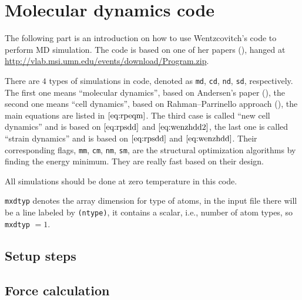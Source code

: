 
\section{Molecular dynamics code}
\label{sec:mdc}

The following part is an introduction on how to use
Wentzcovitch's code to perform MD simulation. The code is
based on one of her papers (\cite{Wentzcovitch:1991ka}), hanged at
\url{http://vlab.msi.umn.edu/events/download/Program.zip}.

There are $4$ types of simulations in code,
denoted as \texttt{md}, \texttt{cd}, \texttt{nd}, \texttt{sd},
respectively. The first one means ``molecular dynamics'',
based on Andersen's paper (\cite{Andersen:1980ew}),
the second one means ``cell dynamics'', based on
Rahman–Parrinello approach (\cite{Parrinello:1980kx}),
the main equations are listed in $\eqref{eq:rpeqm}$.
The third case is called ``new cell dynamics'' and is based on
$\eqref{eq:rpsdd}$ and $\eqref{eq:wenzhdd2}$,
the last one is called ``strain dynamics'' and is based on
$\eqref{eq:rpsdd}$ and $\eqref{eq:wenzhdd}$.
Their corresponding flags, \texttt{mm}, \texttt{cm},
\texttt{nm}, \texttt{sm}, are the structural optimization algorithms
by finding the energy minimum. They are really fast
based on their design.

All simulations should be done at zero temperature in this code.

\texttt{mxdtyp} denotes the array dimension for type of atoms,
in the input file there will be a line labeled by \texttt{(ntype)}, it
contains a scalar, i.e., number of atom types, so \texttt{mxdtyp} $=1$.



\subsection{Setup steps}











\subsection{Force calculation}









